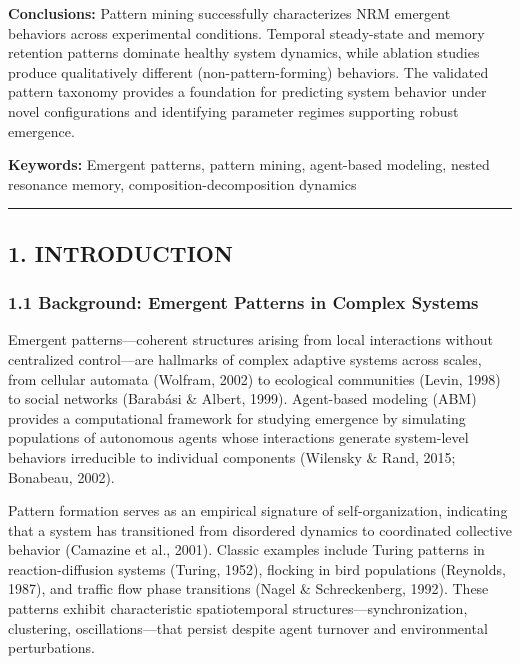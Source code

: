 \documentclass[
]{article}
\begin{document}
\textbf{Conclusions:} Pattern mining successfully characterizes NRM
emergent behaviors across experimental conditions. Temporal steady-state
and memory retention patterns dominate healthy system dynamics, while
ablation studies produce qualitatively different (non-pattern-forming)
behaviors. The validated pattern taxonomy provides a foundation for
predicting system behavior under novel configurations and identifying
parameter regimes supporting robust emergence.

\textbf{Keywords:} Emergent patterns, pattern mining, agent-based
modeling, nested resonance memory, composition-decomposition dynamics

\begin{center}\rule{0.5\linewidth}{0.5pt}\end{center}

\subsection{1. INTRODUCTION}\label{introduction}

\subsubsection{1.1 Background: Emergent Patterns in Complex
Systems}\label{background-emergent-patterns-in-complex-systems}

Emergent patterns---coherent structures arising from local interactions
without centralized control---are hallmarks of complex adaptive systems
across scales, from cellular automata (Wolfram, 2002) to ecological
communities (Levin, 1998) to social networks (Barabási \& Albert, 1999).
Agent-based modeling (ABM) provides a computational framework for
studying emergence by simulating populations of autonomous agents whose
interactions generate system-level behaviors irreducible to individual
components (Wilensky \& Rand, 2015; Bonabeau, 2002).

Pattern formation serves as an empirical signature of self-organization,
indicating that a system has transitioned from disordered dynamics to
coordinated collective behavior (Camazine et al., 2001). Classic
examples include Turing patterns in reaction-diffusion systems (Turing,
1952), flocking in bird populations (Reynolds, 1987), and traffic flow
phase transitions (Nagel \& Schreckenberg, 1992). These patterns exhibit
characteristic spatiotemporal structures---synchronization, clustering,
oscillations---that persist despite agent turnover and environmental
perturbations.
\end{document}
